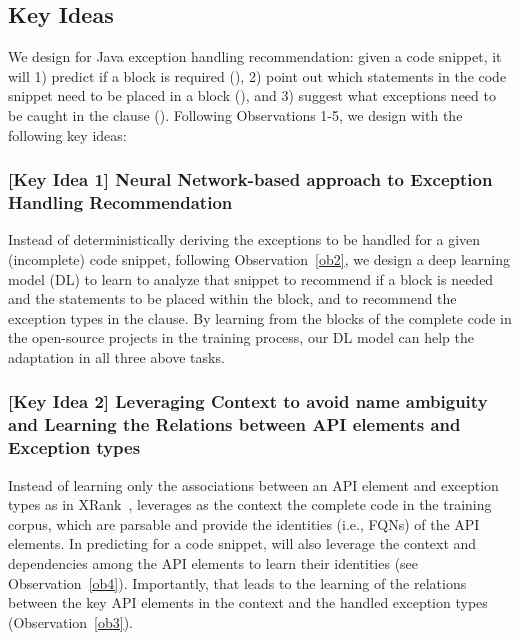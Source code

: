 \subsection{Key Ideas}
\label{key:sec}

We design {\tool} for Java exception handling recommendation:
given a code snippet, it will 1) predict if a  block
is required ({\xblock}), 2) point out which statements in the code
snippet need to be placed in a  block ({\xstate}), and
3) suggest what exceptions need to be caught in the 
clause ({\xtype}).
Following Observations 1-5, we design {\tool} with the following key
ideas:



\subsubsection{{\bf [Key Idea 1] Neural Network-based approach to Exception Handling Recommendation}}
Instead of deterministically deriving the exceptions to be handled for
a given (incomplete) code snippet, following Observation~\ref{ob2}, we
design a deep learning model (DL) to learn to analyze that snippet to
recommend if a  block is needed and the statements to
be placed within the  block, and to recommend the
exception types in the  clause.  By learning from the
 blocks of the complete code in the open-source
projects in the training process, our DL model can help the adaptation
in all three above tasks.




\vspace{2pt}
\subsubsection{{\bf [Key Idea 2] Leveraging Context to avoid
name ambiguity and Learning the Relations between API elements and
Exception types}} Instead of learning only the associations between an
API element and exception types as in XRank~\cite{xrank-fse20},
{\tool} leverages as the context the complete code in the training
corpus, which are parsable and provide the identities (i.e., FQNs) of
the API elements. In predicting for a code snippet, {\tool} will also
leverage the context and dependencies among the API elements to learn
their identities (see Observation~\ref{ob4}). Importantly,
that leads to the learning of the relations between the key API
elements in the context and the handled exception types
(Observation~\ref{ob3}).

